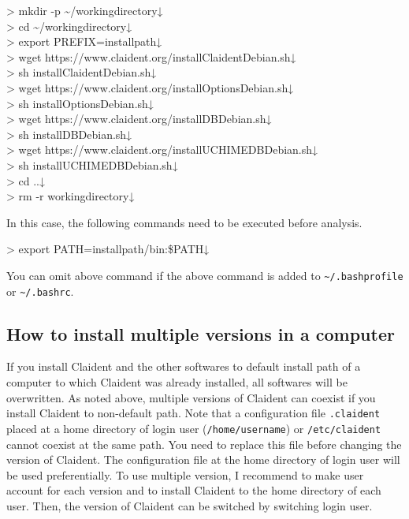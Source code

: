 \documentclass[titlepage,10pt,a4paper,english]{jsbook}
\newenvironment{cmd}{\begin{oframed}\raggedright\ttfamily\footnotesize\setlength{\baselineskip}{1.4em}}{\end{oframed}\vspace{-1em}}
\begin{document}
\begin{cmd}
{\textgreater} mkdir -p {\textasciitilde}/workingdirectory↓\\
{\textgreater} cd {\textasciitilde}/workingdirectory↓\\
{\textgreater} export PREFIX=install{\textunderscore}path↓\\
{\textgreater} wget https://www.claident.org/installClaident{\textunderscore}Debian.sh↓\\
{\textgreater} sh installClaident{\textunderscore}Debian.sh↓\\
{\textgreater} wget https://www.claident.org/installOptions{\textunderscore}Debian.sh↓\\
{\textgreater} sh installOptions{\textunderscore}Debian.sh↓\\
{\textgreater} wget https://www.claident.org/installDB{\textunderscore}Debian.sh↓\\
{\textgreater} sh installDB{\textunderscore}Debian.sh↓\\
{\textgreater} wget https://www.claident.org/installUCHIMEDB{\textunderscore}Debian.sh↓\\
{\textgreater} sh installUCHIMEDB{\textunderscore}Debian.sh↓\\
{\textgreater} cd ..↓\\
{\textgreater} rm -r workingdirectory↓
\end{cmd}

In this case, the following commands need to be executed before analysis.

\begin{cmd}
{\textgreater} export PATH=install{\textunderscore}path/bin:\$PATH↓
\end{cmd}

You can omit above command if the above command is added to \texttt{{\textasciitilde}/.bash{\textunderscore}profile} or \texttt{{\textasciitilde}/.bashrc}.

\subsection{How to install multiple versions in a computer}

If you install Claident and the other softwares to default install path of a computer to which Claident was already installed, all softwares will be overwritten. As noted above, multiple versions of Claident can coexist if you install Claident to non-default path. Note that a configuration file \texttt{.claident} placed at a home directory of login user (\texttt{/home/username}) or \texttt{/etc/claident} cannot coexist at the same path. You need to replace this file before changing the version of Claident. The configuration file at the home directory of login user will be used preferentially. To use multiple version, I recommend to make user account for each version and to install Claident to the home directory of each user. Then, the version of Claident can be switched by switching login user.
\end{document}
